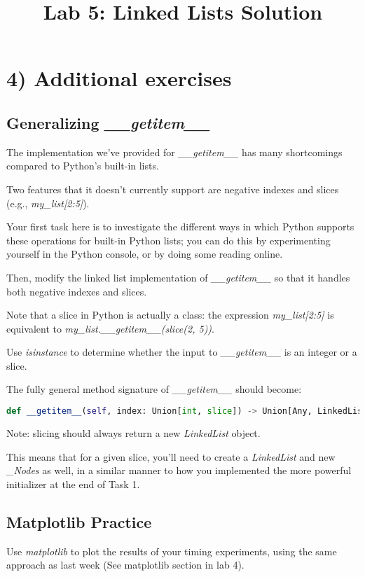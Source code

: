 \documentclass[12pt]{article}
\begin{document}
\title{Lab 5: Linked Lists Solution}
\date{}
\maketitle

\section*{4) Additional exercises}
\subsection*{Generalizing \textit{\_\_getitem\_\_}}
The implementation we’ve provided for \textit{\_\_getitem\_\_} has many shortcomings
compared to Python’s built-in lists.

\bigskip

\noindent Two features that it doesn’t currently support are negative indexes and slices
(e.g., \textit{my\_list[2:5]}).

\bigskip

\noindent Your first task here is to investigate the different ways in which Python
supports these operations for built-in Python lists; you can do this by experimenting
yourself in the Python console, or by doing some reading online.

\bigskip

\noindent Then, modify the linked list implementation of \textit{\_\_getitem\_\_}
so that it handles both negative indexes and slices.

\bigskip

\noindent Note that a slice in Python is actually a class: the expression
\textit{my\_list[2:5]} is equivalent to \textit{my\_list.\_\_getitem\_\_(slice(2, 5))}.

\bigskip

\noindent Use \textit{isinstance} to determine whether the input to \textit{\_\_getitem\_\_}
is an integer or a slice.

\bigskip

\noindent The fully general method signature of \textit{\_\_getitem\_\_} should
become:

\bigskip

\begin{lstlisting}[language=python]
    def __getitem__(self, index: Union[int, slice]) -> Union[Any, LinkedList]
\end{lstlisting}

\bigskip

\noindent Note: slicing should always return a new \textit{LinkedList} object.

\bigskip

\noindent This means that for a given slice, you’ll need to create a \textit{LinkedList} and new
\textit{\_Nodes} as well, in a similar manner to how you implemented the more
powerful initializer at the end of Task 1.


\subsection*{Matplotlib Practice}
Use \textit{matplotlib} to plot the results of your timing experiments, using the same
approach as last week (See matplotlib section in lab 4).
\end{document}
